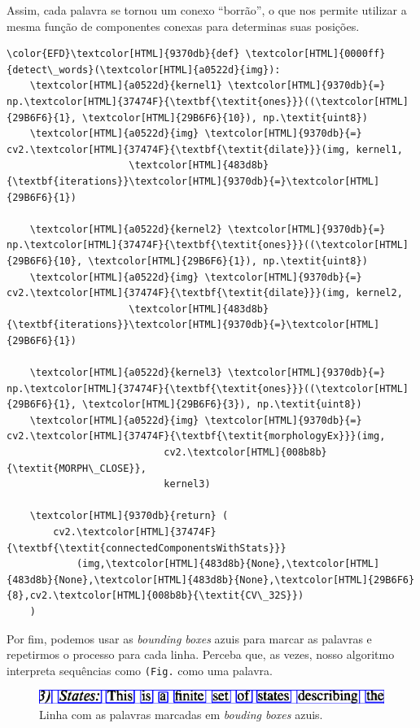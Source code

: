 \documentclass[twocolumn, 10pt]{article}
\begin{document}
Assim, cada palavra se tornou um conexo ``borrão'', o que nos permite utilizar a mesma função de componentes conexas para determinas suas posições.
\begin{Code}
\begin{Verbatim}
\color{EFD}\textcolor[HTML]{9370db}{def} \textcolor[HTML]{0000ff}{detect\_words}(\textcolor[HTML]{a0522d}{img}):
    \textcolor[HTML]{a0522d}{kernel1} \textcolor[HTML]{9370db}{=} np.\textcolor[HTML]{37474F}{\textbf{\textit{ones}}}((\textcolor[HTML]{29B6F6}{1}, \textcolor[HTML]{29B6F6}{10}), np.\textit{uint8})
    \textcolor[HTML]{a0522d}{img} \textcolor[HTML]{9370db}{=} cv2.\textcolor[HTML]{37474F}{\textbf{\textit{dilate}}}(img, kernel1,
                     \textcolor[HTML]{483d8b}{\textbf{iterations}}\textcolor[HTML]{9370db}{=}\textcolor[HTML]{29B6F6}{1})

    \textcolor[HTML]{a0522d}{kernel2} \textcolor[HTML]{9370db}{=} np.\textcolor[HTML]{37474F}{\textbf{\textit{ones}}}((\textcolor[HTML]{29B6F6}{10}, \textcolor[HTML]{29B6F6}{1}), np.\textit{uint8})
    \textcolor[HTML]{a0522d}{img} \textcolor[HTML]{9370db}{=} cv2.\textcolor[HTML]{37474F}{\textbf{\textit{dilate}}}(img, kernel2,
                     \textcolor[HTML]{483d8b}{\textbf{iterations}}\textcolor[HTML]{9370db}{=}\textcolor[HTML]{29B6F6}{1})

    \textcolor[HTML]{a0522d}{kernel3} \textcolor[HTML]{9370db}{=} np.\textcolor[HTML]{37474F}{\textbf{\textit{ones}}}((\textcolor[HTML]{29B6F6}{1}, \textcolor[HTML]{29B6F6}{3}), np.\textit{uint8})
    \textcolor[HTML]{a0522d}{img} \textcolor[HTML]{9370db}{=} cv2.\textcolor[HTML]{37474F}{\textbf{\textit{morphologyEx}}}(img,
                           cv2.\textcolor[HTML]{008b8b}{\textit{MORPH\_CLOSE}},
                           kernel3)

    \textcolor[HTML]{9370db}{return} (
        cv2.\textcolor[HTML]{37474F}{\textbf{\textit{connectedComponentsWithStats}}}
            (img,\textcolor[HTML]{483d8b}{None},\textcolor[HTML]{483d8b}{None},\textcolor[HTML]{483d8b}{None},\textcolor[HTML]{29B6F6}{8},cv2.\textcolor[HTML]{008b8b}{\textit{CV\_32S}})
    )
\end{Verbatim}
\end{Code}

Por fim, podemos usar as \emph{bounding boxes} azuis para marcar as palavras e repetirmos o processo para cada linha.
Perceba que, as vezes, nosso algoritmo interpreta sequências como \texttt{(Fig.} como uma palavra.

\begin{figure}[htbp]
\centering
\includegraphics[width=.9\linewidth]{./img/line5.png}
\caption{Linha com as palavras marcadas em \emph{bouding boxes} azuis.}
\end{figure}
\end{document}
